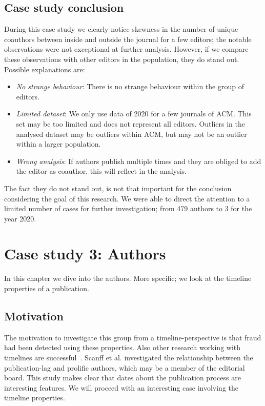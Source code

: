 \documentclass{ou-report}
\begin{document}
\section{Case study conclusion}
During this case study we clearly notice skewness in the number of unique 
coauthors between inside and outside the journal for a few editors; the notable 
observations were not exceptional at further analysis.
However, if we compare these observations with other editors in the population,
they do stand out. Possible explanations are:
\begin{itemize}
    \item \emph{No strange behaviour}: There is no strange behaviour within the
        group of editors.
    \item \emph{Limited dataset}: We only use data of 2020 for a few journals of
        ACM. This set may be too limited and does not represent all editors.
        Outliers in the analysed dataset may be outliers within ACM, but may not
        be an outlier within a larger population.
    \item \emph{Wrong analysis}: If authors publish multiple times and they
        are obliged to add the editor as coauthor, this will reflect in the 
        analysis.
\end{itemize}
The fact they do not stand out, is not that important for the conclusion
considering the goal of this research. We were able to direct the attention to
a limited number of cases for further investigation; from 479 authors to 3 for 
the year 2020.

\chapter{Case study 3: Authors}
\label{chp:case3}
In this chapter we dive into the authors. More specific; we look at the timeline
properties of a publication.

\section{Motivation}
The motivation to investigate this group from a timeline-perspective is that
fraud had been detected using these properties. Also other research working with
timelines are successful~\cite{SNCMBL2021}. Scanff et al. investigated the 
relationship between the publication-lag and prolific authors, which may be a 
member of the editorial board. This study makes clear that dates about the
publication process are interesting features.  
We will proceed with an interesting case involving the timeline properties.
\end{document}
